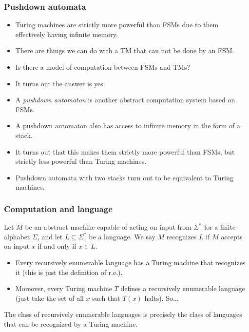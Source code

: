 \documentclass[handout]{beamer}
\begin{document}
\begin{frame}
\frametitle{Pushdown automata}
\begin{itemize}
\item Turing machines are strictly more powerful than FSMs due to them effectively having infinite memory. 
\item There are things we can do with a TM that can not be done by an FSM. 
\item Is there a model of computation between FSMs and TMs? 
\item It turns out the answer is yes. 
\item A \emph{pushdown automaton} is another abstract computation system based on FSMs. 
\item A pushdown automaton also has access to infinite memory in the form of a stack. 
\item It turns out that this makes them strictly more powerful than FSMs, but strictly less powerful than Turing machines. 
\item Pushdown automata with two stacks turn out to be equivalent to Turing machines. 
\end{itemize}
\end{frame}

\begin{frame}
\frametitle{Computation and language}
\begin{definition}[Recognize]
Let $M$ be an abstract machine capable of acting on input from $\Sigma^*$ for a finite alphabet $\Sigma$, and let $L\subseteq\Sigma^*$ be a language. We say $M$ recognizes $L$ if $M$ accepts on input $x$ if and only if $x\in L$. 
\end{definition}
\begin{itemize}
\item Every recursively enumerable language has a Turing machine that recognizes it (this is just the definition of r.e.). 
\item Moreover, every Turing machine $T$ defines a recursively enumerable language (just take the set of all $x$ such that $T(x)$ halts). So...
\end{itemize}
\begin{theorem}
The class of recursively enumerable languages is precisely the class of languages that can be recognized by a Turing machine.
\end{theorem}
\end{frame}
\end{document}
